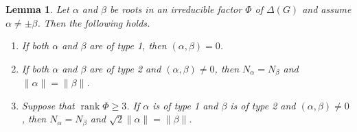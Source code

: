 \documentclass[12pt]{amsart}
\theoremstyle{plain} \numberwithin{equation}{section}
\newtheorem{lemm}[theo]{Lemma}
\theoremstyle{definition}
\def\RG{\Delta(G)}
\DeclareMathOperator{\rank}{rank}
\begin{document}
\begin{lemm} \label{lemm:4-3}
Let $\alpha$ and $\beta$ be roots in an irreducible factor $\Phi$ of $\RG$ and assume $\alpha\not=\pm \beta$. Then the following holds.
\begin{enumerate}
\item If both $\alpha$ and $\beta$ are of type 1, then $(\alpha,\beta)=0$.
\item If both $\alpha$ and $\beta$ are of type 2 and $(\alpha,\beta)\not=0$, then $N_\alpha=N_\beta$ and $\|\alpha\|=\|\beta\|$.
\item Suppose that $\rank\Phi\ge 3$.  If $\alpha$ is of type 1 and $\beta$ is of type 2 and $(\alpha,\beta)\not=0$, then $N_\alpha=N_\beta$ and $\sqrt{2}\|\alpha\|=\|\beta\|$.
\end{enumerate} 
\end{lemm}
\end{document}

